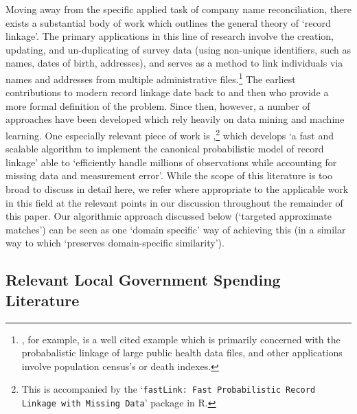 \documentclass[12pt]{article}
\begin{document}
Moving away from the specific applied task of company name reconciliation, there exists a substantial body of work which outlines the general theory of `record linkage'. The primary applications in this line of research involve the creation, updating, and un-duplicating of survey data (using non-unique identifiers, such as names, dates of birth, addresses), and serves as a method to link individuals via names and addresses from multiple administrative files.\footnote{\cite{SIM:SIM4780140510}, for example, is a well cited example which is primarily concerned with the probabalistic linkage of large public health data files, and other applications involve population census's or death indexes.} The earliest contributions to modern record linkage date back to \cite{Newcombe954} and then \cite{doi:10.1080/01621459.1969.10501049} who provide a more formal definition of the problem. Since then, however, a number of approaches have been developed which rely heavily on data mining and machine learning. One especially relevant piece of work is \cite{imai2017},\footnote{This is accompanied by the `\texttt{fastLink: Fast Probabilistic Record Linkage with Missing Data}' package in R.} which develops `a fast and
scalable algorithm to implement the canonical probabilistic model of record linkage' able to `efficiently handle millions of observations while accounting for missing data and measurement error'. While the scope of this literature is too broad to discuss in detail here, we refer where appropriate to the applicable work in this field at the relevant points in our discussion throughout the remainder of this paper. Our algorithmic approach discussed below (`targeted approximate matches') can be seen as one `domain specific' way of achieving this (in a similar way to \cite{1192377} which `preserves domain-specific similarity').

\subsection{Relevant Local Government Spending Literature}
\end{document}
